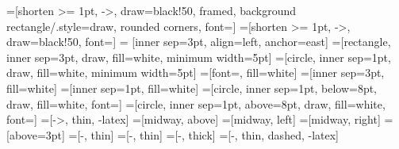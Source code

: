 \newcommand{\rel}{\sim}
\newcommand{\rrestr}{\triangleright}
\newcommand{\st}{\; | \;}
\renewcommand{\.}{. \;}

\newcommand{\neigh}[1]{\operatorname{neigh}_{#1}}
\newcommand{\isomorph}{\cong}
\newcommand{\scont}[2]{\eta_{#1}(#2)}
\newcommand{\cont}[2]{\operatorname{cont}_{#1}(#2)}
\newcommand{\emb}[1]{\operatorname{emb}(#1)}
\newcommand{\allgraphs}[1]{\mathcal{G}_{#1}}
\newcommand{\emptyGraph}{\varepsilon}
\newcommand{\startG}[1]{Z_{#1}}
\newcommand{\pro}{\to}

\newcommand{\alltgraphs}[1]{\mathcal{TG}_{#1}}
\newcommand{\startTG}[1]{Z_{#1}}
\newcommand{\ms}[1]{\overset{#1}{\leftarrow}}
\newcommand{\mt}[1]{\overset{#1}{\rightarrow}}
\newcommand{\source}{\operatorname{s}}
\newcommand{\Source}{\operatorname{S}}
\newcommand{\target}{\operatorname{t}}
\newcommand{\Target}{\operatorname{T}}
\newcommand{\cderiv}[3]{
	\ifx\relax#2\relax%
	\overset{#1}{\Rrightarrow}_{#3}%
	\else
	\overset{#1,#2}{\Rrightarrow}_{#3}%
	\fi
}
\newcommand{\deriv}[3]{
	\ifx\relax#2\relax
	\overset{#1}{\Rightarrow}_{#3}
	\else
	\overset{#1,#2}{\Rightarrow}_{#3}
	\fi
}
\newcommand{\derivtr}[1]{
	\Rightarrow^*_{#1}
}
\newcommand{\tcderiv}[3]{
	\ifx\relax#2\relax
	\overset{#1}{\Rrightarrow}_{#3}
	\else
	\overset{#1,#2}{\Rrightarrow}_{#3}
	\fi
}
\newcommand{\tderiv}[3]{
	\ifx\relax#2\relax
	\overset{#1}{\Rightarrow}_{#3}
	\else
	\overset{#1,#2}{\Rightarrow}_{#3}
	\fi
}
\newcommand{\tderivtr}[1]{
	\Rightarrow^*_{#1}
}

\newcommand{\?}{\;\operatorname{\textbf{?}}\;}
\renewcommand{\:}{\;\operatorname{\textbf{:}}\;}
\newcommand{\Break}{\textbf{break}}
\newcommand{\Select}{\textbf{select}}
\newcommand{\Program}{\textbf{program}\;}
\newcommand{\Just}{\operatorname{\text{Just}}\;}
\newcommand{\Nothing}{\operatorname{\text{Nothing}}\;}
\newcommand{\pto}{\nrightarrow}
\newcommand{\ptree}[3]{
	\ifx&#2&%
	(#1 \rightrightarrows #3)
	\else
	(#1^#2 \rightrightarrows #3)
	\fi
}

=[shorten >= 1pt, ->, draw=black!50, framed, background rectangle/.style={draw, rounded corners}, font=\scriptsize ]
=[shorten >= 1pt, ->, draw=black!50, font=\scriptsize]
 = [inner sep=3pt, align=left, anchor=east]
=[rectangle, inner sep=3pt, draw, fill=white, minimum width=5pt]
=[circle, inner sep=1pt, draw, fill=white, minimum width=5pt]
=[font=\Large, fill=white]
=[inner sep=3pt, fill=white]
=[inner sep=1pt, fill=white]
=[circle, inner sep=1pt, below=8pt, draw, fill=white, font=\tiny]
=[circle, inner sep=1pt, above=8pt, draw, fill=white, font=\tiny]
=[->, thin, -latex]
=[midway, above]
=[midway, left]
=[midway, right]
=[above=3pt]
=[-, thin]
=[-, thin]
=[-, thick]
=[-, thin, dashed, -latex]

\newcommand{\ridX}{-0.3}
\newcommand{\ridY}{0.5}
\newcommand{\lhsX}{-0.3}
\newcommand{\pipeUY}{-0.5}
\newcommand{\pipeBY}{0.5}


